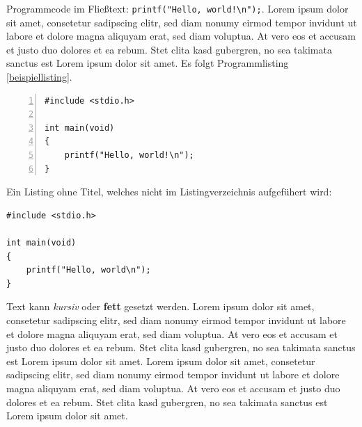 \documentclass[a4paper, 11pt, toc=listof, toc=bib]{scrbook}
\begin{document}
Programmcode im Fließtext: \lstinline{printf("Hello, world!\n");}.
Lorem ipsum dolor sit amet, consetetur sadipscing elitr, sed diam nonumy eirmod tempor invidunt ut labore et dolore magna aliquyam erat, sed diam voluptua. At vero eos et accusam et justo duo dolores et ea rebum. Stet clita kasd gubergren, no sea takimata sanctus est Lorem ipsum dolor sit amet.
Es folgt Programmlisting \ref{beispiellisting}.

\begin{lstlisting}[caption={Beschreibung des Listings.}, label=beispiellisting, frame=tblr, numbers=left]
#include <stdio.h>

int main(void)
{
    printf("Hello, world!\n");
}
\end{lstlisting}
Ein Listing ohne Titel, welches nicht im Listingverzeichnis aufgefühert wird:

\begin{lstlisting}
#include <stdio.h>

int main(void)
{
    printf("Hello, world\n");
}
\end{lstlisting}

Text kann \emph{kursiv} oder \textbf{fett} gesetzt werden.
Lorem ipsum dolor sit amet, consetetur sadipscing elitr, sed diam nonumy eirmod tempor invidunt ut labore et dolore magna aliquyam erat, sed diam voluptua. At vero eos et accusam et justo duo dolores et ea rebum. Stet clita kasd gubergren, no sea takimata sanctus est Lorem ipsum dolor sit amet. Lorem ipsum dolor sit amet, consetetur sadipscing elitr, sed diam nonumy eirmod tempor invidunt ut labore et dolore magna aliquyam erat, sed diam voluptua. At vero eos et accusam et justo duo dolores et ea rebum. Stet clita kasd gubergren, no sea takimata sanctus est Lorem ipsum dolor sit amet.



\backmatter %
\printbibliography
\listoffigures
\listoftables
\lstlistoflistings

\end{document}
